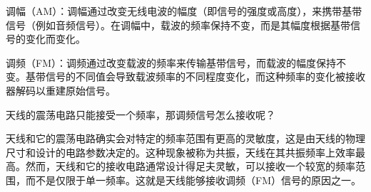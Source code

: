 
调幅（AM）：调幅通过改变无线电波的幅度（即信号的强度或高度），来携带基带信号（例如音频信号）。在调幅中，载波的频率保持不变，而是其幅度根据基带信号的变化而变化。

调频（FM）：调频通过改变载波的频率来传输基带信号，而载波的幅度保持不变。基带信号的不同值会导致载波频率的不同程度变化，而这种频率的变化被接收器解码以重建原始信号。

天线的震荡电路只能接受一个频率，那调频信号怎么接收呢？

天线和它的震荡电路确实会对特定的频率范围有更高的灵敏度，这是由天线的物理尺寸和设计的电路参数决定的。这种现象被称为共振，天线在其共振频率上效率最高。然而，天线和它的接收电路通常设计得足夫灵敏，可以接收一个较宽的频率范围，而不是仅限于单一频率。这就是天线能够接收调频（FM）信号的原因之一。
